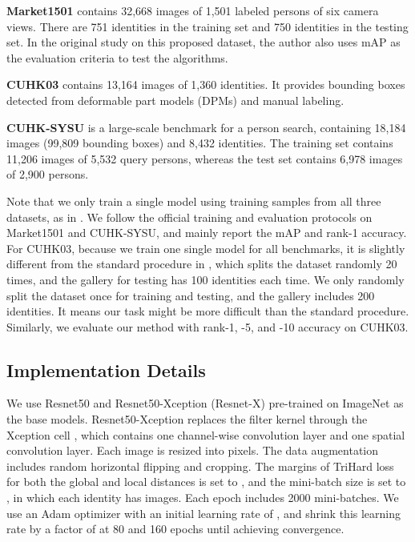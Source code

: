 \documentclass[10pt,twocolumn,letterpaper]{article}
\begin{document}
\textbf{Market1501} contains 32,668 images of 1,501 labeled persons of six camera views.
There are 751 identities in the training set and 750 identities in the testing set.
In the original study on this proposed dataset, the author also uses mAP as the evaluation criteria to test the algorithms.

\textbf{CUHK03} contains 13,164 images of 1,360 identities.
It provides bounding boxes detected from deformable part models (DPMs) and manual labeling.



\textbf{CUHK-SYSU} is a large-scale benchmark for a person search, containing 18,184 images (99,809 bounding boxes) and 8,432 identities.
The training set contains 11,206 images of 5,532 query persons, whereas the test set contains 6,978 images of 2,900 persons.

Note that we only train a single model using training samples from all three datasets, as in \cite{xiao2016learning,zhao2017spindle}. We follow the official training and evaluation protocols on Market1501 and CUHK-SYSU, and mainly report the mAP and rank-1 accuracy.
For CUHK03, because we train one single model for all benchmarks, it is slightly different from the standard procedure in \cite{Li2014DeepReID}, which splits the dataset randomly 20 times, and the gallery for testing has 100 identities each time. We only randomly split the dataset once for training and testing, and the gallery includes 200 identities. It means our task might be more difficult than the standard procedure. Similarly, we evaluate our method with rank-1, -5, and -10 accuracy on CUHK03.


\subsection{Implementation Details}
We use Resnet50 and Resnet50-Xception (Resnet-X) pre-trained on ImageNet \cite{russakovsky2015imagenet} as the base models.
Resnet50-Xception replaces the  filter kernel through the Xception cell \cite{chollet2016xception}, which contains one  channel-wise convolution layer and one  spatial convolution layer. Each image is resized into  pixels. The data augmentation includes random horizontal flipping and cropping.
The margins of TriHard loss for both the global and local distances is set to , and the mini-batch size is set to , in which each identity has  images.
Each epoch includes 2000 mini-batches. We use an Adam optimizer with an initial learning rate of , and shrink this learning rate by a factor of  at 80 and 160 epochs until achieving convergence.
\end{document}
